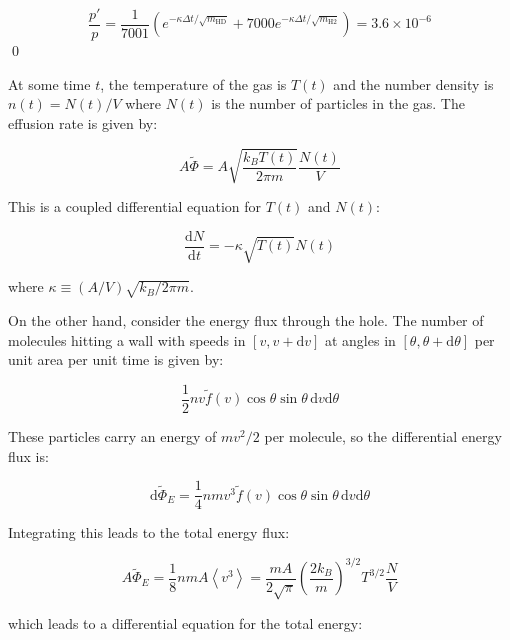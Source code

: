 \documentclass[12pt]{article}
\begin{document}
\begin{equation}
    \frac{p'}{p} = \frac{1}{7001} \left( e^{-\kappa \Delta t/\sqrt{m_{\text{HD}}}} + 7000 e^{-\kappa \Delta t/\sqrt{m_{\text{H2}}}} \right) = 3.6 \times 10^{-6}
\end{equation}
\qed


At some time $t$, the temperature of the gas is $T(t)$ and the number density is $n(t) = N(t)/V$ where $N(t)$ is the number of particles in the gas. The effusion rate is given by:

\begin{equation}
    A\tilde{\Phi} = A \sqrt{\frac{k_{B}T(t)}{2\pi m}} \frac{N(t)}{V}
\end{equation}

This is a coupled differential equation for $T(t)$ and $N(t)$:

\begin{equation}
    \frac{\mathrm{d}N}{\mathrm{d}t} = -\kappa \sqrt{T(t)} N(t)
\end{equation}

where $\kappa \equiv (A/V) \sqrt{k_{B}/2\pi m}$.

On the other hand, consider the energy flux through the hole. The number of molecules hitting a wall with speeds in $[v, v + \mathrm{d}v]$ at angles in $[\theta, \theta + \mathrm{d}\theta]$ per unit area per unit time is given by:

\begin{equation}
    \frac{1}{2} nv \tilde{f}(v) \cos{\theta} \sin{\theta} \, \mathrm{d}v \mathrm{d}\theta
\end{equation}

These particles carry an energy of $mv^{2}/2$ per molecule, so the differential energy flux is:

\begin{equation}
    \mathrm{d}\tilde{\Phi}_{E} = \frac{1}{4} nmv^{3} \tilde{f}(v) \cos{\theta} \sin{\theta} \, \mathrm{d}v \mathrm{d}\theta
\end{equation}

Integrating this leads to the total energy flux:

\begin{equation}
    A\tilde{\Phi}_{E} = \frac{1}{8} nmA \left\langle v^{3} \right\rangle = \frac{mA}{2\sqrt{\pi}} \left( \frac{2k_{B}}{m} \right)^{3/2} T^{3/2} \frac{N}{V} 
\end{equation}

which leads to a differential equation for the total energy:
\end{document}
